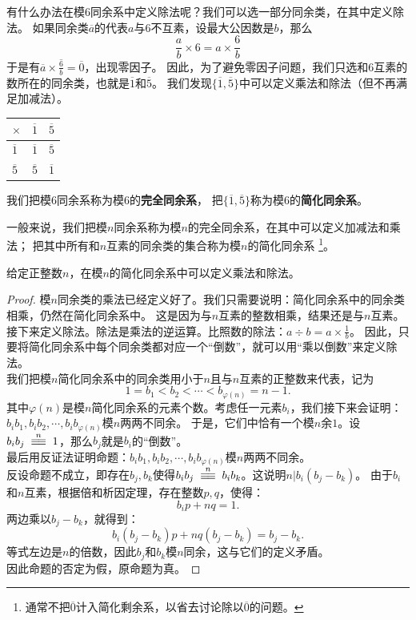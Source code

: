 \documentclass[12pt,UTF8]{ctexbook}
\begin{document}
有什么办法在模$6$同余系中定义除法呢？我们可以选一部分同余类，在其中定义除法。
如果同余类$\overline{a}$的代表$a$与$6$不互素，设最大公因数是$b$，那么
$$ \frac{a}{b} \times 6 = a \times \frac{6}{b} $$
于是有$\overline{a} \times \overline{\frac{6}{b}} = \overline{0}$，出现零因子。
因此，为了避免零因子问题，我们只选和$6$互素的数所在的同余类，也就是$\overline{1}$和$\overline{5}$。
我们发现$\{\overline{1}, \overline{5}\}$中可以定义乘法和除法（但不再满足加减法）。
\begin{center}
    \begin{tabular}{ | p{2em}<{\centering} | p{2em}<{\centering} | p{2em}<{\centering} | }
        \hline
            $\times$   & $\overline{1}$ & $\overline{5}$ \\ [0.5ex] 
        \hline
        $\overline{1}$ & $\overline{1}$ & $\overline{5}$ \\
        \hline
        $\overline{5}$ & $\overline{5}$ & $\overline{1}$ \\
        \hline
    \end{tabular}
\end{center}
我们把模$6$同余系称为模$6$的\textbf{完全同余系}，
把$\{\overline{1}, \overline{5}\}$称为模$6$的\textbf{简化同余系}。

一般来说，我们把模$n$同余系称为模$n$的完全同余系，在其中可以定义加减法和乘法；
把其中所有和$n$互素的同余类的集合称为模$n$的简化同余系
\footnote{通常不把$\overline{0}$计入简化剩余系，以省去讨论除以$\overline{0}$的问题。}。

\begin{tm}\label{tm:3-2-0}
    给定正整数$n$，在模$n$的简化同余系中可以定义乘法和除法。
\end{tm}
\begin{proof}
    模$n$同余类的乘法已经定义好了。我们只需要说明：简化同余系中的同余类相乘，仍然在简化同余系中。
    这是因为与$n$互素的整数相乘，结果还是与$n$互素。\\
    接下来定义除法。除法是乘法的逆运算。比照数的除法：$a \div b = a \times \frac{1}{b}$。
    因此，只要将简化同余系中每个同余类都对应一个“倒数”，就可以用“乘以倒数”来定义除法。\\
    我们把模$n$简化同余系中的同余类用小于$n$且与$n$互素的正整数来代表，记为
    $$1 = b_1 < b_2 < \cdots < b_{\varphi(n)} = n-1.$$
    其中$\varphi(n)$是模$n$简化同余系的元素个数。考虑任一元素$b_i$，我们接下来会证明：
    $b_ib_1, b_ib_2, \cdots, b_ib_{\varphi(n)}$模$n$两两不同余。
    于是，它们中恰有一个模$n$余$1$。设$b_ib_j \tong{n} 1$，那么$b_j$就是$b_i$的“倒数”。\\
    最后用反证法证明命题：$b_ib_1, b_ib_2, \cdots, b_ib_{\varphi(n)}$模$n$两两不同余。\\
    反设命题不成立，即存在$b_j, b_k$使得$b_ib_j \tong{n} b_ib_k$。这说明$n | b_i(b_j - b_k)$。
    由于$b_i$和$n$互素，根据倍和析因定理，存在整数$p, q$，使得：
    $$ b_ip + nq = 1.$$
    两边乘以$b_j - b_k$，就得到：
    $$ b_i(b_j - b_k)p + nq(b_j - b_k) = b_j - b_k.$$
    等式左边是$n$的倍数，因此$b_j$和$b_k$模$n$同余，这与它们的定义矛盾。\\
    因此命题的否定为假，原命题为真。
\end{proof}
\end{document}
